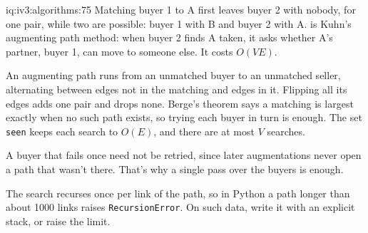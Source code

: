 \begin{solution}{iq:iv3:algorithms:75}
Matching buyer 1 to A first leaves buyer 2 with nobody, for one pair, while two are possible: buyer 1 with B and buyer 2 with A.  is Kuhn's augmenting path method: when buyer 2 finds A taken, it asks whether A's partner, buyer 1, can move to someone else. It costs $O(VE)$.
\label{lst:iv3:al:pairing}

An augmenting path runs from an unmatched buyer to an unmatched seller, alternating between edges not in the matching and edges in it. Flipping all its edges adds one pair and drops none. Berge's theorem says a matching is largest exactly when no such path exists, so trying each buyer in turn is enough. The set \texttt{seen} keeps each search to $O(E)$, and there are at most $V$ searches.

A buyer that fails once need not be retried, since later augmentations never open a path that wasn't there. That's why a single pass over the buyers is enough.

The search recurses once per link of the path, so in Python a path longer than about 1000 links raises \texttt{RecursionError}. On such data, write it with an explicit stack, or raise the limit.

\end{solution}

